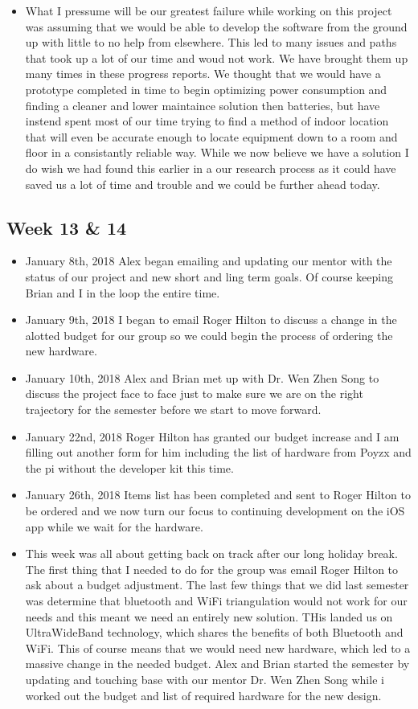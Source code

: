 \documentclass[12pt]{article}
\begin{document}
\begin{itemize}
			\item What I pressume will be our greatest failure while working on this project was assuming that we would be able to develop the software from the ground up with little to no help from elsewhere.  This led to many issues and paths that took up a lot of our time and woud not work.  We have brought them up many times in these progress reports.  We thought that we would have a prototype completed in time to begin optimizing power consumption and finding a cleaner and lower maintaince solution then batteries, but have instend spent most of our time trying to find a method of indoor location that will even be accurate enough to locate equipment down to a room and floor in a consistantly reliable way.  While we now believe we have a solution I do wish we had found this earlier in a our research process as it could have saved us a lot of time and trouble and we could be further ahead today.
		\end{itemize}

	\subsection{Week 13 \& 14}
		\begin{itemize}
			\item January 8th, 2018 Alex began emailing and updating our mentor with the status of our project and new short and ling term goals.  Of course keeping Brian and I in the loop the entire time.
			\item January 9th, 2018 I began to email Roger Hilton to discuss a change in the alotted budget for our group so we could begin the process of ordering the new hardware.
			\item January 10th, 2018 Alex and Brian met up with Dr. Wen Zhen Song to discuss the project face to face just to make sure we are on the right trajectory for the semester before we start to move forward.
			\item January 22nd, 2018 Roger Hilton has granted our budget increase and I am filling out another form for him including the list of hardware from Poyzx and the pi without the developer kit this time.
			\item January 26th, 2018 Items list has been completed and sent to Roger Hilton to be ordered and we now turn our focus to continuing development on the iOS app while we wait for the hardware.
			\item This week was all about getting back on track after our long holiday break. The first thing that I needed to do for the group was email Roger Hilton to ask about a budget adjustment. The last few things that we did last semester was determine that bluetooth and WiFi triangulation would not work for our needs and this meant we need an entirely new solution. THis landed us on UltraWideBand technology, which shares the benefits of both Bluetooth and WiFi. This of course means that we would need new hardware, which led to a massive change in the needed budget.  Alex and Brian started the semester by updating and touching base with our mentor Dr. Wen Zhen Song while i worked out the budget and list of required hardware for the new design.
		\end{itemize}
		
\end{document}

